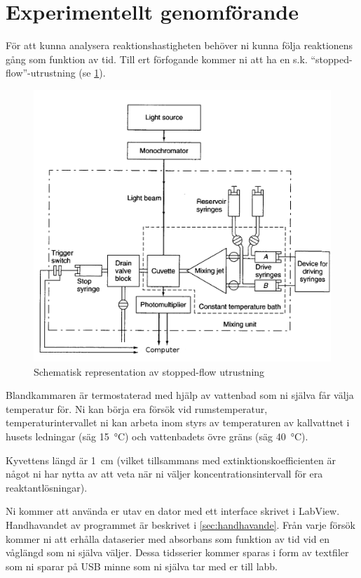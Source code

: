 \section{Experimentellt genomförande}
\label{sec:exper}
För att kunna analysera reaktionshastigheten behöver ni kunna följa
reaktionens gång som funktion av tid. Till ert förfogande kommer ni att ha en
s.k. ``stopped-flow''-utrustning (se \cref{fig:stopped-flow}).

\begin{figure}[h,center]
  \centering
  \includegraphics[scale=0.2]{fig/stopped_flow.png}
  \caption{Schematisk representation av stopped-flow utrustning}
  \label{fig:stopped-flow}
\end{figure}

Blandkammaren är termostaterad med hjälp av vattenbad som ni själva får
välja temperatur för. Ni kan börja era försök vid
rumstemperatur, temperaturintervallet ni kan arbeta inom styrs av
temperaturen av kallvattnet i husets ledningar (säg \SI{15}{\celsius})
och vattenbadets övre gräns (säg \SI{40}{\celsius}). 

Kyvettens längd är \SI{1}{\centi\metre} (vilket
tillsammans med extinktionskoefficienten  är något ni har nytta av att
veta när ni väljer koncentrationsintervall för era reaktantlösningar).

Ni kommer att använda er utav en dator med ett interface
skrivet i LabView. Handhavandet av programmet är beskrivet i
\cref{sec:handhavande}. Från varje försök kommer ni att erhålla dataserier med
absorbans som funktion av tid vid en våglängd som ni själva väljer. Dessa
tidsserier kommer sparas i form av textfiler som ni sparar på USB minne
som ni själva tar med er till labb.

